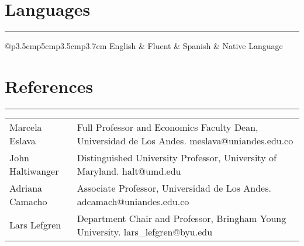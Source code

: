 \documentclass[12pt, letterpaper]{article}
\begin{document}
\vspace{-4mm}

\section*{Languages}
\vspace*{-8mm}
\noindent \rule{\linewidth}{0.2mm}
\noindent
\begin{tabular}{@{}p{3.5cm}p{5cm}p{3.5cm}p{3.7cm}}
English & Fluent	&  Spanish & Native Language \\
\end{tabular}

\vspace{-5mm}

\section*{References}
\vspace*{-8mm}
\noindent \rule{\linewidth}{0.2mm}
\noindent
\begin{tabular}{@{}p{3.5cm}p{13.7cm}}
Marcela Eslava & Full Professor and Economics Faculty Dean, Universidad de Los Andes. meslava@uniandes.edu.co \\ [8mm]
John Haltiwanger & Distinguished University Professor, University of Maryland. halt@umd.edu \\ [4mm]
Adriana Camacho	& Associate Professor, Universidad de Los Andes. adcamach@uniandes.edu.co
\\ [4mm]
Lars Lefgren & Department Chair and Professor, Bringham Young University. lars\_lefgren@byu.edu
\end{tabular}
\end{document}
